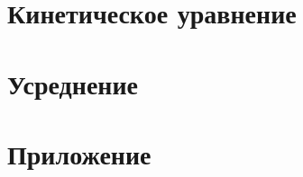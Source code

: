




\section{Кинетическое уравнение}





\newpage
\section{Усреднение}



\newpage
\section{Приложение}


\newpage

